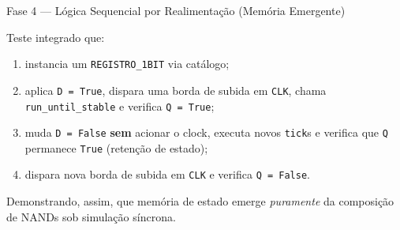\documentclass[11pt,a4paper]{article}
\begin{document}
\begin{phasebox}{Fase 4 — Lógica Sequencial por Realimentação (Memória Emergente)}{}
\begin{acceptbox}
\vspace{2pt}
Teste integrado que:
\begin{enumerate}[label=(\roman*)]
    \item instancia um \texttt{REGISTRO\_1BIT} via catálogo;
    \item aplica \texttt{D = True}, dispara uma borda de subida em \texttt{CLK}, chama \texttt{run\_until\_stable} e verifica \texttt{Q = True};
    \item muda \texttt{D = False} \textbf{sem} acionar o clock, executa novos \texttt{tick}s e verifica que \texttt{Q} permanece \texttt{True} (retenção de estado);
    \item dispara nova borda de subida em \texttt{CLK} e verifica \texttt{Q = False}.
\end{enumerate}
Demonstrando, assim, que memória de estado emerge \emph{puramente} da composição de NANDs sob simulação síncrona.
\end{acceptbox}
\end{phasebox}
\end{document}
